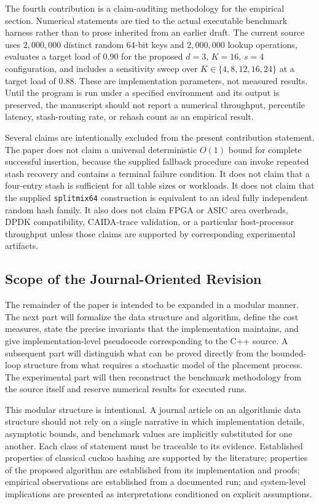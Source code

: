 \documentclass[conference]{IEEEtran}
\begin{document}
The fourth contribution is a claim-auditing methodology for the empirical section. Numerical statements are tied to the actual executable benchmark harness rather than to prose inherited from an earlier draft. The current source uses $2{,}000{,}000$ distinct random 64-bit keys and $2{,}000{,}000$ lookup operations, evaluates a target load of $0.90$ for the proposed $d=3$, $K=16$, $s=4$ configuration, and includes a sensitivity sweep over $K\in\{4,8,12,16,24\}$ at a target load of $0.88$. These are implementation parameters, not measured results. Until the program is run under a specified environment and its output is preserved, the manuscript should not report a numerical throughput, percentile latency, stash-routing rate, or rehash count as an empirical result.

Several claims are intentionally excluded from the present contribution statement. The paper does not claim a universal deterministic $O(1)$ bound for complete successful insertion, because the supplied fallback procedure can invoke repeated stash recovery and contains a terminal failure condition. It does not claim that a four-entry stash is sufficient for all table sizes or workloads. It does not claim that the supplied \texttt{splitmix64} construction is equivalent to an ideal fully independent random hash family. It also does not claim FPGA or ASIC area overheads, DPDK compatibility, CAIDA-trace validation, or a particular host-processor throughput unless those claims are supported by corresponding experimental artifacts.

\subsection{Scope of the Journal-Oriented Revision}

The remainder of the paper is intended to be expanded in a modular manner. The next part will formalize the data structure and algorithm, define the cost measures, state the precise invariants that the implementation maintains, and give implementation-level pseudocode corresponding to the C++ source. A subsequent part will distinguish what can be proved directly from the bounded-loop structure from what requires a stochastic model of the placement process. The experimental part will then reconstruct the benchmark methodology from the source itself and reserve numerical results for executed runs.

This modular structure is intentional. A journal article on an algorithmic data structure should not rely on a single narrative in which implementation details, asymptotic bounds, and benchmark values are implicitly substituted for one another. Each class of statement must be traceable to its evidence. Established properties of classical cuckoo hashing are supported by the literature; properties of the proposed algorithm are established from its implementation and proofs; empirical observations are established from a documented run; and system-level implications are presented as interpretations conditioned on explicit assumptions.
\end{document}
